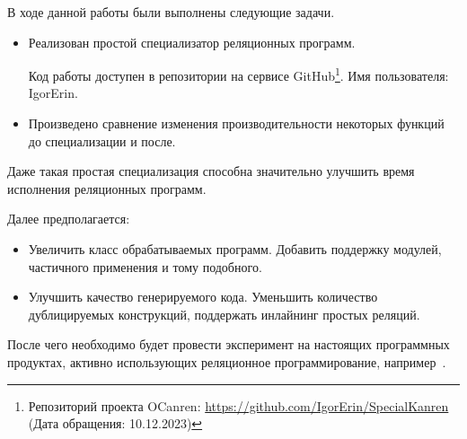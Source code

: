 
В ходе данной работы были выполнены следующие задачи.

\begin{itemize}
    \item Реализован простой специализатор реляционных программ.
    
    Код работы доступен в репозитории на сервисе GitHub\footnote{Репозиторий проекта OCanren: \url{https://github.com/IgorErin/SpecialKanren} \\
    (Дата обращения: 10.12.2023)}. Имя
    пользователя: IgorErin. 
    
    \item Произведено сравнение изменения производительности некоторых функций до специализации и после.
\end{itemize}


Даже такая простая специализация способна значительно улучшить время исполнения реляционных программ.

Далее предполагается:

\begin{itemize}
    \item Увеличить класс обрабатываемых программ. Добавить поддержку модулей, частичного применения и тому подобного.
    \item Улучшить качество генерируемого кода. Уменьшить количество дублицируемых конструкций, поддержать инлайнинг простых реляций.
\end{itemize}

После чего необходимо будет провести эксперимент на настоящих программных продуктах, активно использующих реляционное программирование, например~\cite{JGS}.